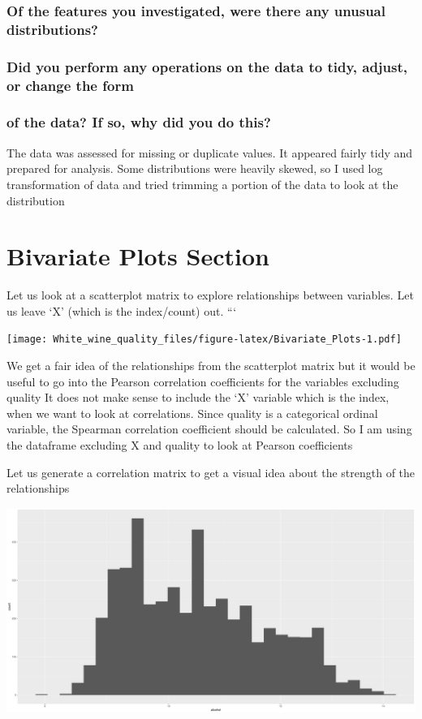 \documentclass[]{article}
\begin{document}
\subsubsection{Of the features you investigated, were there any unusual
distributions?}\label{of-the-features-you-investigated-were-there-any-unusual-distributions}

\subsubsection{Did you perform any operations on the data to tidy,
adjust, or change the
form}\label{did-you-perform-any-operations-on-the-data-to-tidy-adjust-or-change-the-form}

\subsubsection{of the data? If so, why did you do
this?}\label{of-the-data-if-so-why-did-you-do-this}

The data was assessed for missing or duplicate values. It appeared
fairly tidy and prepared for analysis. Some distributions were heavily
skewed, so I used log transformation of data and tried trimming a
portion of the data to look at the distribution

\section{Bivariate Plots Section}\label{bivariate-plots-section}

Let us look at a scatterplot matrix to explore relationships between
variables. Let us leave `X' (which is the index/count) out. ```

\texttt{[image: White\_wine\_quality\_files/figure-latex/Bivariate\_Plots-1.pdf]}

We get a fair idea of the relationships from the scatterplot matrix but
it would be useful to go into the Pearson correlation coefficients for
the variables excluding quality It does not make sense to include the
`X' variable which is the index, when we want to look at correlations.
Since quality is a categorical ordinal variable, the Spearman
correlation coefficient should be calculated. So I am using the
dataframe excluding X and quality to look at Pearson coefficients

Let us generate a correlation matrix to get a visual idea about the
strength of the relationships

\includegraphics{White_wine_quality_files/figure-latex/unnamed-chunk-24-1.pdf}
\end{document}
